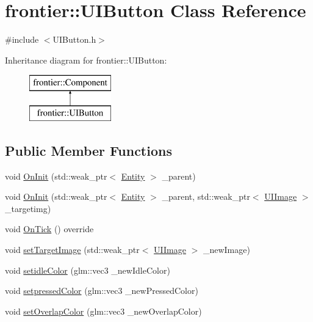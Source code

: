\hypertarget{classfrontier_1_1_u_i_button}{}\section{frontier\+:\+:U\+I\+Button Class Reference}
\label{classfrontier_1_1_u_i_button}


{\ttfamily \#include $<$U\+I\+Button.\+h$>$}

Inheritance diagram for frontier\+:\+:U\+I\+Button\+:\begin{figure}[H]
\begin{center}
\leavevmode
\includegraphics[height=2.000000cm]{classfrontier_1_1_u_i_button}
\end{center}
\end{figure}
\subsection*{Public Member Functions}
\begin{DoxyCompactItemize}
\item 
void \hyperlink{classfrontier_1_1_u_i_button_a1c4555865094fdd2dd9dd595740c05b0}{On\+Init} (std\+::weak\+\_\+ptr$<$ \hyperlink{classfrontier_1_1_entity}{Entity} $>$ \+\_\+parent)
\item 
void \hyperlink{classfrontier_1_1_u_i_button_a4109dc4a0ce449e954f8f7b3c1ca53a9}{On\+Init} (std\+::weak\+\_\+ptr$<$ \hyperlink{classfrontier_1_1_entity}{Entity} $>$ \+\_\+parent, std\+::weak\+\_\+ptr$<$ \hyperlink{classfrontier_1_1_u_i_image}{U\+I\+Image} $>$ \+\_\+targetimg)
\item 
void \hyperlink{classfrontier_1_1_u_i_button_a8eda4323e4d0c2cd2c6a4639f39a1a09}{On\+Tick} () override
\item 
void \hyperlink{classfrontier_1_1_u_i_button_a6696828bc5e44fd3f3ce112adaae5e01}{set\+Target\+Image} (std\+::weak\+\_\+ptr$<$ \hyperlink{classfrontier_1_1_u_i_image}{U\+I\+Image} $>$ \+\_\+new\+Image)
\item 
void \hyperlink{classfrontier_1_1_u_i_button_a4519ba97fa74ad95f7ef6ffbc119c77f}{setidle\+Color} (glm\+::vec3 \+\_\+new\+Idle\+Color)
\item 
void \hyperlink{classfrontier_1_1_u_i_button_ae326211a2323793403317c8e7069ddb6}{setpressed\+Color} (glm\+::vec3 \+\_\+new\+Pressed\+Color)
\item 
void \hyperlink{classfrontier_1_1_u_i_button_adb1a88e493b597fd62ce7fcc1cf6cad9}{set\+Overlap\+Color} (glm\+::vec3 \+\_\+new\+Overlap\+Color)
\end{DoxyCompactItemize}
